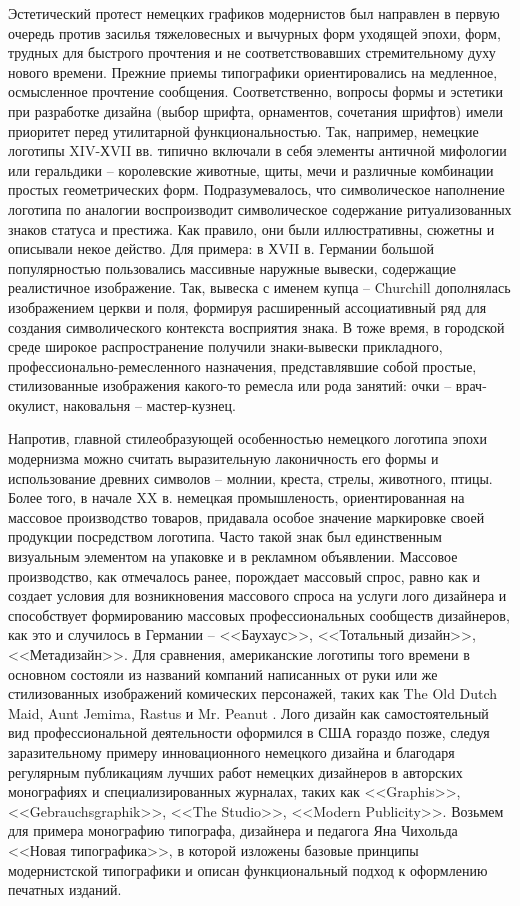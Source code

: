 Эстетический протест немецких графиков модернистов был направлен в первую очередь против засилья
тяжеловесных и вычурных форм уходящей эпохи, форм, трудных для быстрого прочтения и не
соответствовавших стремительному духу нового времени. Прежние приемы типографики ориентировались на
медленное, осмысленное прочтение сообщения. Соответственно, вопросы формы и эстетики при разработке
дизайна (выбор шрифта, орнаментов, сочетания шрифтов) имели приоритет перед утилитарной
функциональностью. Так, например, немецкие логотипы XIV-ХVII вв. типично включали в себя элементы
античной мифологии или геральдики -- королевские животные, щиты, мечи и различные комбинации простых
геометрических форм. Подразумевалось, что символическое наполнение логотипа по аналогии
воспроизводит символическое содержание ритуализованных знаков статуса и престижа. Как правило, они
были иллюстративны, сюжетны и описывали некое действо. Для примера: в ХVII в. Германии большой
популярностью пользовались массивные наружные вывески, содержащие реалистичное изображение. Так,
вывеска с именем купца -- Churchill дополнялась изображением церкви и поля, формируя расширенный
ассоциативный ряд для создания символического контекста восприятия знака. В тоже время, в городской
среде широкое распространение получили знаки-вывески прикладного, профессионально-ремесленного
назначения, представлявшие собой простые, стилизованные изображения какого-то ремесла или рода
занятий: очки -- врач-окулист, наковальня -- мастер-кузнец.

Напротив, главной стилеобразующей особенностью немецкого логотипа эпохи модернизма можно считать
выразительную лаконичность его формы и использование древних символов – молнии, креста, стрелы,
животного, птицы. Более того, в начале XX в. немецкая промышленость, ориентированная на массовое
производство товаров, придавала особое значение маркировке своей продукции посредством
логотипа. Часто такой знак был единственным визуальным элементом на упаковке и в рекламном
объявлении. Массовое производство, как отмечалось ранее, порождает массовый спрос, равно как и
создает условия для возникновения массового спроса на услуги лого дизайнера и способствует
формированию массовых профессиональных сообществ дизайнеров, как это и случилось в Германии --
<<Баухаус>>, <<Тотальный дизайн>>, <<Метадизайн>>. Для сравнения, американские логотипы того времени в
основном состояли из названий компаний написанных от руки или же стилизованных изображений
комических персонажей, таких как The Old Dutch Maid, Aunt Jemima, Rastus и
Mr. Peanut \autocite{link:mpr}. Лого дизайн как самостоятельный вид профессиональной деятельности
оформился в США гораздо позже, следуя заразительному примеру инновационного немецкого дизайна и
благодаря регулярным публикациям лучших работ немецких дизайнеров в авторских монографиях и
специализированных журналах, таких как <<Graphis>>, <<Gebrauchsgraphik>>, <<The Studio>>, <<Modern
Publicity>>. Возьмем для примера монографию типографа, дизайнера и педагога Яна Чихольда <<Новая
типографика>>\autocite{chihold2011}, в которой изложены базовые принципы модернистской типографики и
описан функциональный подход к оформлению печатных изданий.

